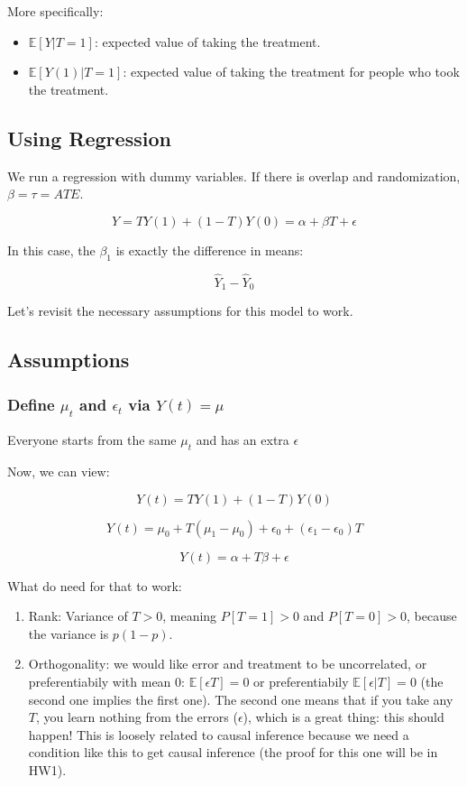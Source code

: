 \documentclass{article}
\begin{document}
More specifically:
\begin{itemize}
    \item $\mathbb{E}[Y | T = 1]$: expected value of taking the treatment.
    \item $\mathbb{E}[Y(1) | T = 1]$: expected value of taking the treatment for people who took the treatment.
\end{itemize}

\subsection{Using Regression}
We run a regression with dummy variables. If there is overlap and randomization, $\beta = \tau = ATE$.

$$
Y = TY(1) + (1-T)Y(0) = \alpha + \beta T + \epsilon
$$

In this case, the $\beta_1$ is exactly the difference in means:

$$
\hat{Y}_1 - \hat{Y}_0
$$

Let's revisit the necessary assumptions for this model to work.

\subsection{Assumptions}
\subsubsection{Define $\mu_t$ and $\epsilon_t$ via $Y(t) = \mu$}
Everyone starts from the same $\mu_t$ and has an extra $\epsilon$

Now, we can view:

$$
Y(t) = T Y(1) + (1-T)Y(0)
$$

$$
Y(t) = \mu_0 + T (\mu_1 - \mu_0) + \epsilon_0 + (\epsilon_1 - \epsilon_0) T
$$

$$
Y(t) = \alpha + T \beta + \epsilon
$$

What do need for that to work:

\begin{enumerate}
    \item Rank: Variance of $T > 0$, meaning $P[T=1] > 0$ and $P[T=0] > 0$, because the variance is $p (1 - p)$.
    \item Orthogonality: we would like error and treatment to be uncorrelated, or preferentiabily with mean 0: $\mathbb{E}[\epsilon T] = 0$ or preferentiabily $\mathbb{E}[\epsilon | T] = 0$ (the second one implies the first one). The second one means that if you take any $T$, you learn nothing from the errors ($\epsilon$), which is a great thing: this should happen! This is loosely related to causal inference because we need a condition like this to get causal inference (the proof for this one will be in HW1).
\end{enumerate}
\end{document}
